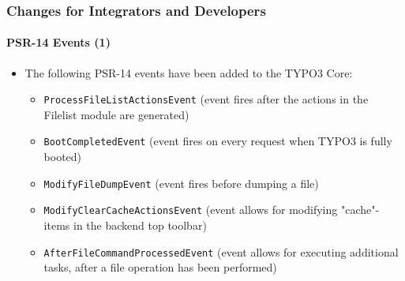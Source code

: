 %

\begin{frame}[fragile]
	\frametitle{Changes for Integrators and Developers}
	\framesubtitle{PSR-14 Events (1)}


	\begin{itemize}
		\item The following PSR-14 events have been added to the TYPO3 Core:
			\begin{itemize}
				\item \texttt{ProcessFileListActionsEvent}\newline
					(event fires after the actions in the Filelist module are generated)
				\vspace{0.1cm}
				\item \texttt{BootCompletedEvent}\newline
					(event fires on every request when TYPO3 is fully booted)
				\vspace{0.1cm}
				\item \texttt{ModifyFileDumpEvent}\newline
					(event fires before dumping a file)
				\vspace{0.1cm}
				\item \texttt{ModifyClearCacheActionsEvent}\newline
					(event allows for modifying "cache"-items in the backend top toolbar)
				\vspace{0.1cm}
				\item \texttt{AfterFileCommandProcessedEvent}\newline
					(event allows for executing additional tasks, after a file operation has been performed)
			\end{itemize}
	\end{itemize}
\end{frame}

